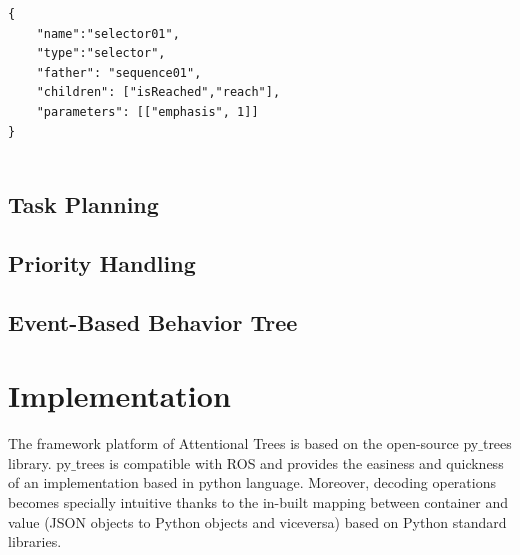 \documentclass[conference]{IEEEtran}
\begin{document}
 \begin{verbatim}
{
    "name":"selector01",
    "type":"selector",
    "father": "sequence01",
    "children": ["isReached","reach"],
    "parameters": [["emphasis", 1]]
}


\end{verbatim}
\subsection{Task Planning}
\subsection{Priority Handling}
\subsection{Event-Based Behavior Tree}

\section*{Implementation}
The framework platform of Attentional Trees is based on the open-source py$\_$trees\cite{b4} library. py$\_$trees is compatible with ROS and provides the easiness and quickness of an implementation based in python language. Moreover, decoding operations becomes specially intuitive thanks to the in-built mapping between container and value (JSON objects to Python objects and viceversa) based on Python standard libraries.
\end{document}
